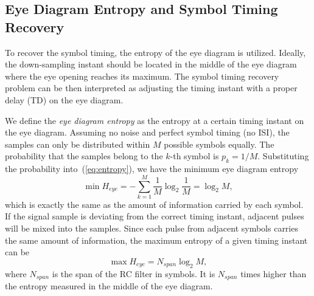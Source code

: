 \documentclass[journal,comsoc,onecolumn, 12pt,draftclsnofoot]{IEEEtran}
\begin{document}
\subsection{Eye Diagram Entropy and Symbol Timing Recovery}
\label{sec:eye_entp}
To recover the symbol timing, the entropy of the eye diagram is utilized. 
Ideally, the down-sampling instant should be located in the middle of the eye diagram where the eye opening reaches its maximum.
The symbol timing recovery problem can be then interpreted as adjusting the timing instant with a proper delay (TD) on the eye diagram.

We define the \textit{eye diagram entropy} as the entropy at a certain timing instant on the eye diagram.
Assuming no noise and perfect symbol timing (no ISI),
the samples can only be distributed within \(M\) possible symbols equally.
The probability that the samples belong to the $k$-th symbol is \(p_k=1/M\).
Substituting the probability into~(\ref{eq:entropy}), we have the minimum eye diagram entropy
\begin{equation}
\min{H_{eye}} =  - \sum\limits_{k = 1}^M {{\frac{1}{M}}\log_2 {\frac{1}{M}}}=\log_2 {M},
\label{eq:entropy_mid}
\end{equation}
which is exactly the same as the amount of information carried by each symbol.
If the signal sample is deviating from the correct timing instant, adjacent pulses will be mixed into the samples.
Since each pulse from adjacent symbols carries the same amount of information, the maximum entropy of a given timing instant can be
\begin{equation}
\max{H_{eye}} =  N_{span}\log_2 {M},
\label{eq:entropy_neb}
\end{equation}
where \(N_{span}\) is the span of the RC filter in symbols.
It is \(N_{span}\) times higher than the entropy measured in the middle of the eye diagram.
\end{document}

